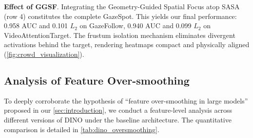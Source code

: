 \documentclass[sigconf,review,anonymous,screen]{acmart}
\begin{document}
\textbf{Effect of GGSF}. Integrating the Geometry-Guided Spatial Focus atop SASA (row 4) constitutes the complete GazeSpot. This yields our final performance: 0.958 AUC and 0.101 $L_2$ on GazeFollow, 0.940 AUC and 0.099 $L_2$ on VideoAttentionTarget. The frustum isolation mechanism eliminates divergent activations behind the target, rendering heatmaps compact and physically aligned (\autoref{fig:crowd_visualization}).

\begin{table}[htbp]
  \centering
  \caption{Ablation study evaluating the individual contributions of Multi-layer Features, SASA, and GGSF on the GazeFollow and VideoAttentionTarget datasets (Backbone: DINOv3 ViT-B/16). The best results are highlighted in bold.}
  \label{tab:ablation}
\end{table}

\subsection{Analysis of Feature Over-smoothing}
\label{sec:experiments_45}
To deeply corroborate the hypothesis of ``feature over-smoothing in large models'' proposed in our \autoref{sec:introduction}, we conduct a feature-level analysis across different versions of DINO under the baseline architecture. The quantitative comparison is detailed in \autoref{tab:dino_oversmoothing}.
\end{document}
